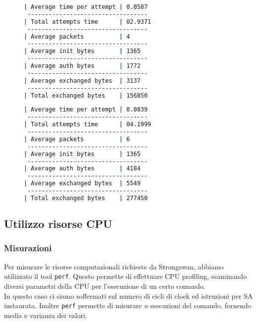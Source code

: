 \documentclass[
10pt, %
a4paper, %
oneside, %
headinclude,footinclude, %
BCOR5mm, %
]{scrartcl}
\begin{document}
\begin{figure}[ht]
    \begin{minipage}{0.45\textwidth}
      \begin{lstlisting}[caption=Risultati ECDSA, language=bash]
| Average time per attempt | 0.0587 
 ----------------------------------
| Total attempts time      | 02.9371
 ----------------------------------
| Average packets          | 4 
 ----------------------------------
| Average init bytes       | 1365 
 ----------------------------------
| Average auth bytes       | 1772 
 ----------------------------------
| Average exchanged bytes  | 3137 
 ----------------------------------
| Total exchanged bytes    | 156850
      \end{lstlisting}
    \end{minipage}\hfill
    \begin{minipage}{0.45\textwidth}
      \begin{lstlisting}[caption=Risultati RSA, language=bash]
| Average time per attempt | 0.0839
 ----------------------------------
| Total attempts time      | 04.1999
 ----------------------------------
| Average packets          | 6 
 ----------------------------------
| Average init bytes       | 1365 
 ----------------------------------
| Average auth bytes       | 4184 
 ----------------------------------
| Average exchanged bytes  | 5549 
 ----------------------------------
| Total exchanged bytes    | 277450
      \end{lstlisting}
    \end{minipage}
  \end{figure}


\subsection{Utilizzo risorse CPU}

\subsubsection{Misurazioni}

Per misurare le risorse computazionali richieste da Strongswan, abbiamo utilizzato il tool \lstinline|perf|.
Questo permette di effettuare CPU profiling, esaminando diversi parametri della CPU per l'esecuzione di un certo comando.
\\
In questo caso ci siamo soffermati sul numero di cicli di clock ed istruzioni per SA instaurata.
Inoltre \lstinline|perf| permette di misurare \textit{n} esecuzioni del comando, fornendo media e varianza dei valori.
\end{document}
